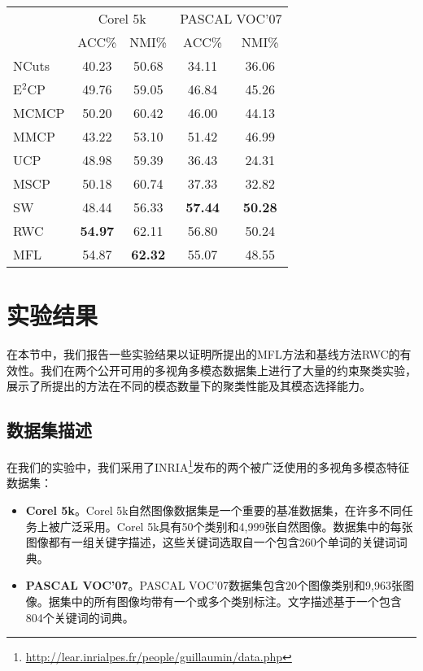 \begin{table}[tb]
	\label{tab3:2modal}
	\centering
	\setlength{\tabcolsep}{15pt}
	\begin{tabular}{lcccc}
		\toprule
		&\multicolumn{2}{c}{Corel 5k} & \multicolumn{2}{c}{PASCAL VOC'07} \\
		\cmidrule(lr){2-3}
		\cmidrule(lr){4-5}
		& ACC\% & NMI\% & ACC\% & NMI\% \\
		\midrule
		NCuts\cite{shi2000normalized} & 40.23 & 50.68 & 34.11 & 36.06 \\ 
		E$^2$CP\cite{lu2010constrained} & 49.76 & 59.05 & 46.84 & 45.26 \\
		MCMCP\cite{fu2012modalities} & 50.20 & 60.42 & 46.00 & 44.13 \\  
		MMCP\cite{fu2011multi} & 43.22 & 53.10 & 51.42 & 46.99 \\ 
		UCP\cite{lu2013unified} & 48.98 & 59.39 & 36.43 & 24.31 \\ 
		MSCP\cite{lu2013exhaustive} & 50.18 & 60.74 & 37.33 & 32.82 \\ 
		\midrule
		SW & 48.44 & 56.33 & \textbf{57.44} & \textbf{50.28} \\ 
		RWC & \textbf{54.97} & 62.11 & 56.80 & 50.24 \\ 
		MFL & 54.87 & \textbf{62.32} & 55.07 & 48.55 \\ 
		\bottomrule
	\end{tabular}
\end{table}


\section{实验结果}
\label{sec3:exp}
在本节中，我们报告一些实验结果以证明所提出的MFL方法和基线方法RWC的有效性。我们在两个公开可用的多视角多模态数据集上进行了大量的约束聚类实验，展示了所提出的方法在不同的模态数量下的聚类性能及其模态选择能力。
\subsection{数据集描述}
在我们的实验中，我们采用了INRIA\footnote{\url{http://lear.inrialpes.fr/people/guillaumin/data.php}}发布的两个被广泛使用的多视角多模态特征数据集\cite{guillaumin2009tagprop}：
\begin{itemize}
    \item {\textbf{Corel 5k}}。Corel 5k自然图像数据集是一个重要的基准数据集，在许多不同任务上被广泛采用。Corel 5k具有50个类别和4,999张自然图像。数据集中的每张图像都有一组关键字描述，这些关键词选取自一个包含260个单词的关键词词典。
    \item {\textbf{PASCAL VOC'07}}。PASCAL VOC'07数据集\cite{pascal-voc-2007}包含20个图像类别和9,963张图像。据集中的所有图像均带有一个或多个类别标注。文字描述基于一个包含804个关键词的词典。
\end{itemize}

